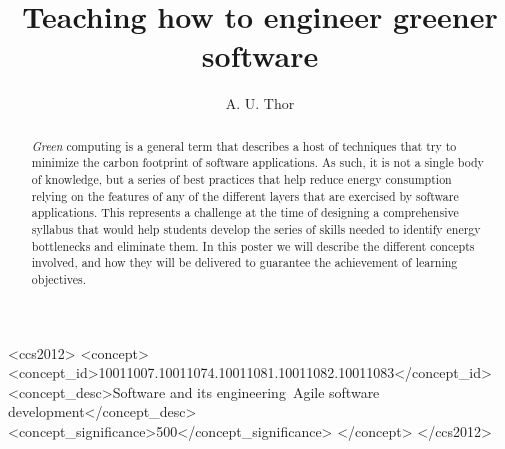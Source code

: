 \documentclass[sigconf]{acmart}
\begin{document}
\title{Teaching how to engineer greener software}

%
\author{A. U. Thor}

\renewcommand{\shortauthors}{A. U. Thor}

\begin{abstract}
{\em Green} computing is a general term that describes a host of techniques that
try to minimize the carbon footprint of software applications. As such, it is
not a single body of knowledge, but a series of best practices that help reduce
energy consumption relying on the features of any of the different layers that
are exercised by software applications. This represents a challenge at the
time of designing a comprehensive syllabus that would help students develop the
series of skills needed to identify energy bottlenecks and eliminate them. In
this poster we will describe the different concepts involved, and how they will
be delivered to guarantee the achievement of learning objectives.
\end{abstract}

\begin{CCSXML}
<ccs2012>
   <concept>
       <concept_id>10011007.10011074.10011081.10011082.10011083</concept_id>
       <concept_desc>Software and its engineering~Agile software development</concept_desc>
       <concept_significance>500</concept_significance>
       </concept>
 </ccs2012>
\end{CCSXML}





\maketitle
\end{document}
